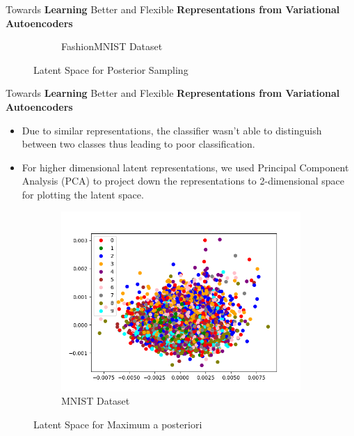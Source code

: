 \documentclass[hyperref={colorlinks,citecolor=blue,linkcolor=blue,urlcolor=blue}]{beamer}
\begin{document}
\begin{frame}{ Towards \textbf{Learning} Better and Flexible \textbf{Representations from Variational Autoencoders} \vspace{0.3em}}
\begin{figure}
\begin{subfigure}[b]{0.4\textwidth}
        \caption{FashionMNIST Dataset}
    \end{subfigure}
    \caption{Latent Space for Posterior Sampling}
  \end{figure}
\end{frame}

\begin{frame}{ Towards \textbf{Learning} Better and Flexible \textbf{Representations from Variational Autoencoders} \vspace{0.3em}}
  \begin{itemize}
    \item Due to similar representations, the classifier wasn't able to distinguish between two classes thus leading to poor classification.
    \item For higher dimensional latent representations, we used Principal Component Analysis (PCA) to project down the representations to 2-dimensional space for plotting the latent space.
  \end{itemize}
  \begin{figure}
    \captionsetup{justification=centering}
    \begin{subfigure}[b]{0.4\textwidth}
        \centering
        \includegraphics[width=\textwidth,]{./Images/latent_MNIST_VAE_MAP.png}
        \caption{MNIST Dataset}
    \end{subfigure}
    \caption{Latent Space for Maximum a posteriori}
  \end{figure}
\end{frame}
\end{document}
